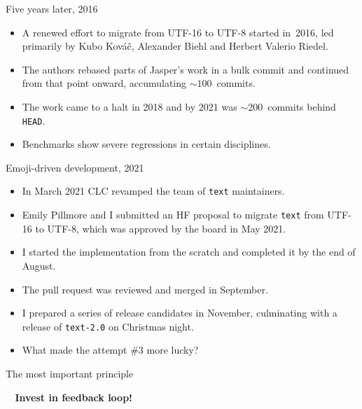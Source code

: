 \documentclass[handout]{beamer}
\begin{document}
\utfchallenges

\begin{frame}{Five years later, 2016}

\begin{itemize}[<+->]
\item A renewed effort to migrate from UTF-16 to UTF-8 started in~2016,
      led primarily by Kubo Kov\'a\v{c}, Alexander Biehl and
      Herbert Valerio Riedel.
\item The authors rebased parts of Jasper's work in a bulk commit
      and continued from that point onward, accumulating $\sim100$~commits.
\item The work came to a halt in 2018 and by 2021
      was $\sim200$~commits behind {\tt HEAD}.
\item Benchmarks show severe regressions in certain disciplines.
\end{itemize}

\end{frame}

\begin{frame}{Emoji-driven development, 2021}

\begin{itemize}[<+->]
\item In March 2021 CLC revamped the team of {\tt text} maintainers.
\item Emily Pillmore and I submitted an HF proposal to migrate {\tt text}
      from UTF-16 to UTF-8, which was approved by the board in May 2021.
\item I started the implementation from the scratch
      and completed it by the end of August.
\item The pull request was reviewed and merged in September.
\item I prepared a series of release candidates in November,
      culminating with a release of {\tt text-2.0} on Christmas night.
      \bigskip
      \bigskip
\item What made the attempt \#3  more lucky?
\end{itemize}

\end{frame}

\begin{frame}{The most important principle}

\setlength{\textwidth}{1.05\textwidth}

\begin{block}{}
\bigskip
\centerline{\Huge\bf \color{ukraine-blue} ~ Invest in feedback loop! ~}
\bigskip
\end{block}

\end{frame}
\end{document}
